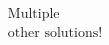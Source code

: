 \documentclass[preview]{standalone}
\begin{document}
\begin{align*}
\text{Multiple}\\\text{other solutions!}
\end{align*}
\end{document}
